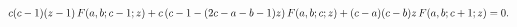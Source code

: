 \[c(c-1)(z-1)\mathop{F\/}\nolimits\!\left(a,b;c-1;z\right)+{c\left(c-1-(2c-a-b-1%
)z\right)}\mathop{F\/}\nolimits\!\left(a,b;c;z\right)+(c-a)(c-b)z\mathop{F\/}%
\nolimits\!\left(a,b;c+1;z\right)=0.\]
